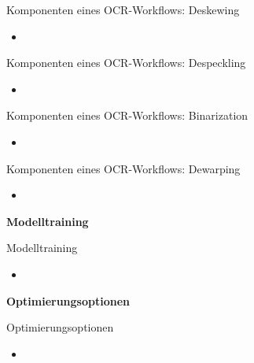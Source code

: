 \documentclass{bbawslides}
\begin{document}
\begin{bbawslide}{Komponenten eines OCR-Workflows: Deskewing}
  \vspace*{7mm}%
  \centerslidestrue%
  \begin{itemize}
    \item
  \end{itemize}
\end{bbawslide}

\begin{bbawslide}{Komponenten eines OCR-Workflows: Despeckling}
  \vspace*{7mm}%
  \centerslidestrue%
  \begin{itemize}
    \item
  \end{itemize}
\end{bbawslide}

\begin{bbawslide}{Komponenten eines OCR-Workflows: Binarization}
  \vspace*{7mm}%
  \centerslidestrue%
  \begin{itemize}
    \item
  \end{itemize}
\end{bbawslide}

\begin{bbawslide}{Komponenten eines OCR-Workflows: Dewarping}
  \vspace*{7mm}%
  \centerslidestrue%
  \begin{itemize}
    \item
  \end{itemize}
\end{bbawslide}

\begin{bbawpart}{\Large\bf Modelltraining}
\end{bbawpart}

\begin{bbawslide}{Modelltraining}
  \vspace*{7mm}%
  \centerslidestrue%
  \begin{itemize}
    \item
  \end{itemize}
\end{bbawslide}

\begin{bbawpart}{\Large\bf Optimierungsoptionen}
\end{bbawpart}

\begin{bbawslide}{Optimierungsoptionen}
  \vspace*{7mm}%
  \centerslidestrue%
  \begin{itemize}
    \item
  \end{itemize}
\end{bbawslide}
\end{document}
